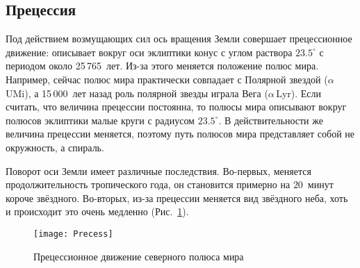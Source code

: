 \subsection{Прецессия}

Под действием возмущающих сил ось вращения Земли совершает прецессионное движение: описывает вокруг оси эклиптики конус с углом раствора $23.5^\circ$ с периодом около  25\,765~лет. Из-за этого меняется положение полюс мира. Например, сейчас полюс мира практически совпадает с Полярной звездой ($\alpha$\,UMi), а 15\,000~лет назад роль полярной звезды играла Вега ($\alpha$\,Lyr). Если считать, что величина прецессии постоянна, то полюсы мира описывают вокруг полюсов эклиптики малые круги с радиусом $23.5^\circ$. В действительности же величина прецессии меняется, поэтому путь полюсов мира представляет собой не окружность, а спираль.

Поворот оси Земли имеет различные последствия. Во-первых, меняется продолжительность тропического года, он становится примерно на $20$~минут короче звёздного. Во-вторых, из-за прецессии меняется вид звёздного неба, хоть и происходит это очень медленно (Рис.~\ref{fig:precession-path}).
\begin{figure}[h!]
\centering
\texttt{[image: Precess]}
\caption{Прецессионное движение северного полюса мира}
\label{fig:precession-path}
\end{figure}
